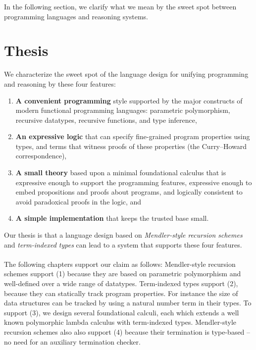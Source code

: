 In the following section, we clarify what we mean by the sweet spot between
programming languages and reasoning systems.

\section{Thesis}\label{sec:intro:thesis}
We characterize the sweet spot of the language design for unifying
programming and reasoning by these four features:
\begin{enumerate}[(1)]
 \item \textbf{A convenient programming} style
         supported by the major constructs of
         modern functional programming languages: 
         parametric polymorphism, recursive datatypes,
         recursive functions, and type inference,

 \item \textbf{An expressive logic} that can specify
         fine-grained program properties using types,
         and terms that witness proofs of these properties 
         (the Curry--Howard correspondence),

 \item \textbf{A small theory} based upon a minimal foundational calculus
         that is expressive enough to support the programming features,
         expressive enough to embed propositions and proofs about programs,
         and logically consistent to avoid paradoxical proofs in the logic, and

 \item \textbf{A simple implementation} that keeps the trusted base small.
\end{enumerate}
Our thesis is
that a language design based on \emph{Mendler-style recursion schemes}
and \emph{term-indexed types} can lead to a system that supports these four
features.

\paragraph{}
The following chapters support our claim as follows:
Mendler-style recursion schemes support (1) because they are based on
parametric polymorphism and well-defined over a wide range of datatypes.
Term-indexed types support (2), because they can statically track
program properties. For instance the size of data structures can be tracked
by using a natural number term in their types.
To support (3), we design several foundational calculi, each which extends
a well known polymorphic lambda calculus with term-indexed types.
Mendler-style recursion schemes also also support (4) because their
termination is type-based -- no need for an auxiliary termination checker.

